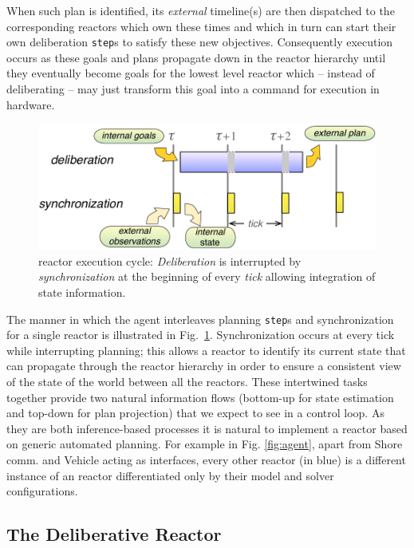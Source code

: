 When such plan is identified, its {\em external} timeline(s) are then
dispatched to the corresponding reactors which own these times and
which in turn can start their own deliberation \texttt{step}s to
satisfy these new objectives. Consequently execution occurs as these
goals and plans propagate down in the reactor hierarchy until they
eventually become goals for the lowest level reactor which -- instead
of deliberating -- may just transform this goal into a command for
execution in hardware.

\begin{figure}[!htbp]
  \centering
  \vskip-1pc
  \includegraphics[width=0.55\columnwidth]{figs/tick-cycle}
  \caption{\small \rx reactor execution cycle: {\em Deliberation} is
    interrupted by {\em synchronization} at the beginning of every
    {\em tick} allowing integration of state information.}
  \label{fig:tick-exec}
  \vskip-0.8pc
\end{figure}

The manner in which the agent interleaves planning \texttt{step}s and
synchronization for a single reactor is illustrated in
Fig.~\ref{fig:tick-exec}. Synchronization occurs at every tick while
interrupting planning; this allows a reactor to identify its current
state that can propagate through the reactor hierarchy in order to
ensure a consistent view of the state of the world between all the
reactors.
These intertwined tasks together provide two natural information flows
(bottom-up for state estimation and top-down for plan projection) that
we expect to see in a control loop. As they are both inference-based
processes it is natural to implement a reactor based on generic
automated planning. For example in Fig. \ref{fig:agent}, apart from
\textsf{Shore comm.} and \textsf{Vehicle} acting as interfaces, every
other reactor (in blue) is a different instance of an \eu reactor
differentiated only by their model and \eu solver configurations.

\subsection{The  \eu Deliberative Reactor}
\label{sec:arch:europa}

